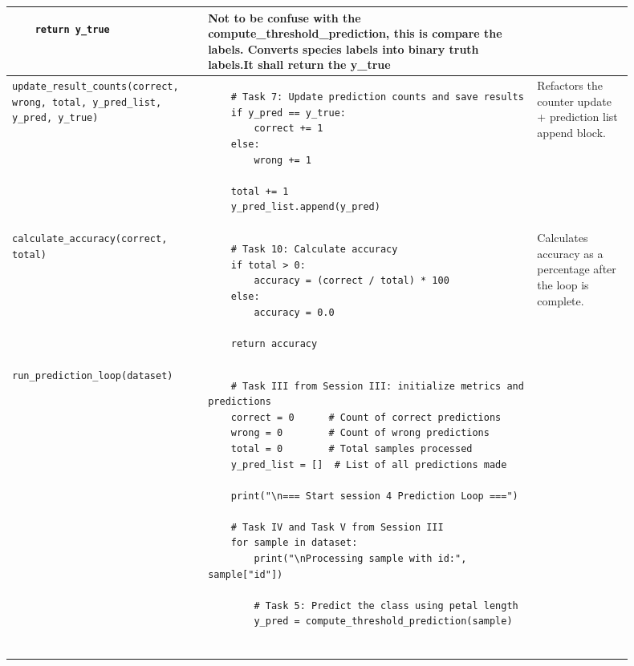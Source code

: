 \begin{landscape}
\begin{longtable}{|p{0.28\linewidth}|p{0.48\linewidth}|p{0.14\linewidth}|}
\begin{verbatim}
    return y_true
\end{verbatim}
& Not to be confuse with the compute\_threshold\_prediction, this is compare the labels. Converts species labels into binary truth labels.It shall return the y\_true \\
\hline
\texttt{update\_result\_counts(correct, wrong, total, y\_pred\_list, y\_pred, y\_true)} & \begin{verbatim}
    # Task 7: Update prediction counts and save results
    if y_pred == y_true:
        correct += 1
    else:
        wrong += 1

    total += 1
    y_pred_list.append(y_pred)

\end{verbatim}
& Refactors the counter update + prediction list append block. \\
\hline
\texttt{calculate\_accuracy(correct, total)} & \begin{verbatim}
    # Task 10: Calculate accuracy
    if total > 0:
        accuracy = (correct / total) * 100
    else:
        accuracy = 0.0

    return accuracy
\end{verbatim}
& Calculates accuracy as a percentage after the loop is complete. \\
\hline
\texttt{run\_prediction\_loop(dataset)} & \begin{verbatim}
    # Task III from Session III: initialize metrics and predictions
    correct = 0      # Count of correct predictions
    wrong = 0        # Count of wrong predictions
    total = 0        # Total samples processed
    y_pred_list = []  # List of all predictions made

    print("\n=== Start session 4 Prediction Loop ===")

    # Task IV and Task V from Session III
    for sample in dataset:
        print("\nProcessing sample with id:", sample["id"])

        # Task 5: Predict the class using petal length
        y_pred = compute_threshold_prediction(sample)


\end{verbatim}
\end{longtable}
\end{landscape}
